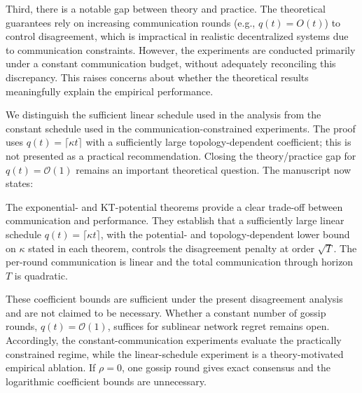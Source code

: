 \documentclass[12pt,english]{reviewresponse}
\newcommand{\order}[1]{\mathcal{O}\left(#1\right)}
\begin{document}
\begin{revcomment}
    Third, there is a notable gap between theory and practice. The theoretical guarantees rely on increasing communication rounds (e.g., $q(t)=O(t)$) to control disagreement, which is impractical in realistic decentralized systems due to communication constraints. However, the experiments are conducted primarily under a constant communication budget, without adequately reconciling this discrepancy. This raises concerns about whether the theoretical results meaningfully explain the empirical performance.
\end{revcomment}
\begin{revresponse}
    We distinguish the sufficient linear schedule used in the analysis from the constant schedule used in the communication-constrained experiments.  The proof uses $q(t)=\lceil\kappa t\rceil$ with a sufficiently large topology-dependent coefficient; this is not presented as a practical recommendation.  Closing the theory/practice gap for $q(t)=\order{1}$ remains an important theoretical question.
    The manuscript now states:
    \begin{changes}
        The exponential- and KT-potential theorems provide a clear trade-off between communication and performance.
        They establish that a sufficiently large linear schedule $q(t)=\lceil\kappa t\rceil$, with the potential- and topology-dependent lower bound on $\kappa$ stated in each theorem, controls the disagreement penalty at order $\sqrt{T}$. The per-round communication is linear and the total communication through horizon $T$ is quadratic.

        These coefficient bounds are sufficient under the present disagreement analysis and are not claimed to be necessary.
        Whether a constant number of gossip rounds, $q(t)=\mathcal{O}(1)$, suffices for sublinear network regret remains open.
        Accordingly, the constant-communication experiments evaluate the practically constrained regime, while the linear-schedule experiment is a theory-motivated empirical ablation.
        If $\rho=0$, one gossip round gives exact consensus and the logarithmic coefficient bounds are unnecessary.
    \end{changes}
\end{revresponse}
\end{document}
